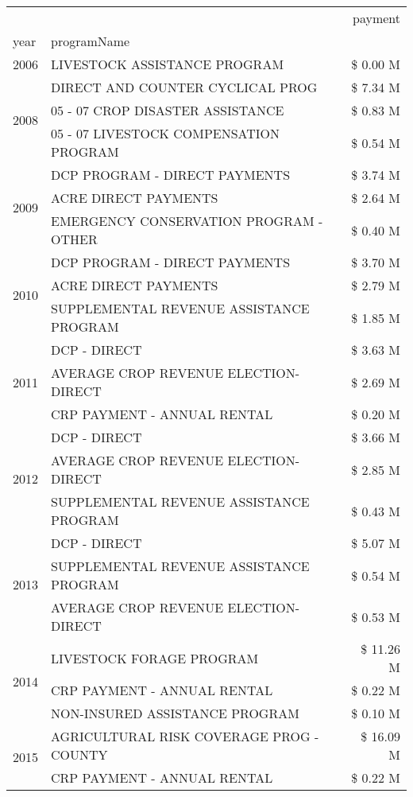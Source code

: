 \begin{tabular}{llr}
\toprule
 &  & payment \\
year & programName &  \\
\midrule
2006 & LIVESTOCK ASSISTANCE PROGRAM & \$ 0.00 M \\
\cline{1-3}
\multirow[t]{3}{*}{2008} & DIRECT AND COUNTER CYCLICAL PROG & \$ 7.34 M \\
 & 05 - 07 CROP DISASTER ASSISTANCE & \$ 0.83 M \\
 & 05 - 07 LIVESTOCK COMPENSATION PROGRAM & \$ 0.54 M \\
\cline{1-3}
\multirow[t]{3}{*}{2009} & DCP PROGRAM - DIRECT PAYMENTS & \$ 3.74 M \\
 & ACRE DIRECT PAYMENTS & \$ 2.64 M \\
 & EMERGENCY CONSERVATION PROGRAM - OTHER & \$ 0.40 M \\
\cline{1-3}
\multirow[t]{3}{*}{2010} & DCP PROGRAM - DIRECT PAYMENTS & \$ 3.70 M \\
 & ACRE DIRECT PAYMENTS & \$ 2.79 M \\
 & SUPPLEMENTAL REVENUE ASSISTANCE PROGRAM & \$ 1.85 M \\
\cline{1-3}
\multirow[t]{3}{*}{2011} & DCP - DIRECT & \$ 3.63 M \\
 & AVERAGE CROP REVENUE ELECTION-DIRECT & \$ 2.69 M \\
 & CRP PAYMENT - ANNUAL RENTAL & \$ 0.20 M \\
\cline{1-3}
\multirow[t]{3}{*}{2012} & DCP - DIRECT & \$ 3.66 M \\
 & AVERAGE CROP REVENUE ELECTION-DIRECT & \$ 2.85 M \\
 & SUPPLEMENTAL REVENUE ASSISTANCE PROGRAM & \$ 0.43 M \\
\cline{1-3}
\multirow[t]{3}{*}{2013} & DCP - DIRECT & \$ 5.07 M \\
 & SUPPLEMENTAL REVENUE ASSISTANCE PROGRAM & \$ 0.54 M \\
 & AVERAGE CROP REVENUE ELECTION-DIRECT & \$ 0.53 M \\
\cline{1-3}
\multirow[t]{3}{*}{2014} & LIVESTOCK FORAGE PROGRAM & \$ 11.26 M \\
 & CRP PAYMENT - ANNUAL RENTAL & \$ 0.22 M \\
 & NON-INSURED ASSISTANCE PROGRAM & \$ 0.10 M \\
\cline{1-3}
\multirow[t]{3}{*}{2015} & AGRICULTURAL RISK COVERAGE PROG - COUNTY & \$ 16.09 M \\
 & CRP PAYMENT - ANNUAL RENTAL & \$ 0.22 M \\

\end{tabular}
